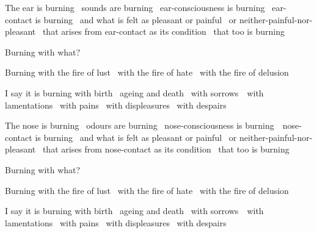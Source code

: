\begin{english-only-hang}
  The ear is burning \breathmark\ sounds are burning \breathmark\ ear-consciousness is burning \breathmark\ ear-contact is burning \breathmark\ and what is felt as pleasant or painful \breathmark\ or neither-painful-nor-pleasant \breathmark\ that arises from ear-contact as its condition \breathmark\ that too is burning
\end{english-only-hang}
\begin{english-only-hang-together}
  Burning with what?
\end{english-only-hang-together}
\begin{english-only-hang-together}
  Burning with the fire of lust \breathmark\ with the fire of hate \breathmark\ with the fire of delusion
\end{english-only-hang-together}
\begin{english-only-hang-together}
  I say it is burning with birth \breathmark\ ageing and death \breathmark\ with \mbox{sorrows}~\breathmark\ with lamentations \breathmark\ with pains \breathmark\ with displeasures \breathmark\ with despairs
\end{english-only-hang-together}

\ifbfiveversion\clearpage\fi

\begin{english-only-hang}
  The nose is burning \breathmark\ odours are burning \breathmark\ nose-consciousness is \mbox{burning}~\breathmark\ nose-contact is burning \breathmark\ and what is felt as pleasant or painful \breathmark\ or neither-painful-nor-pleasant \breathmark\ that arises from nose-contact as its condition \breathmark\ that too is burning
\end{english-only-hang}
\begin{english-only-hang-together}
  Burning with what?
\end{english-only-hang-together}
\begin{english-only-hang-together}
  Burning with the fire of lust \breathmark\ with the fire of hate \breathmark\ with the fire of delusion
\end{english-only-hang-together}
\begin{english-only-hang-together}
  I say it is burning with birth \breathmark\ ageing and death \breathmark\ with \mbox{sorrows}~\breathmark\ with lamentations \breathmark\ with pains \breathmark\ with displeasures \breathmark\ with despairs
\end{english-only-hang-together}

